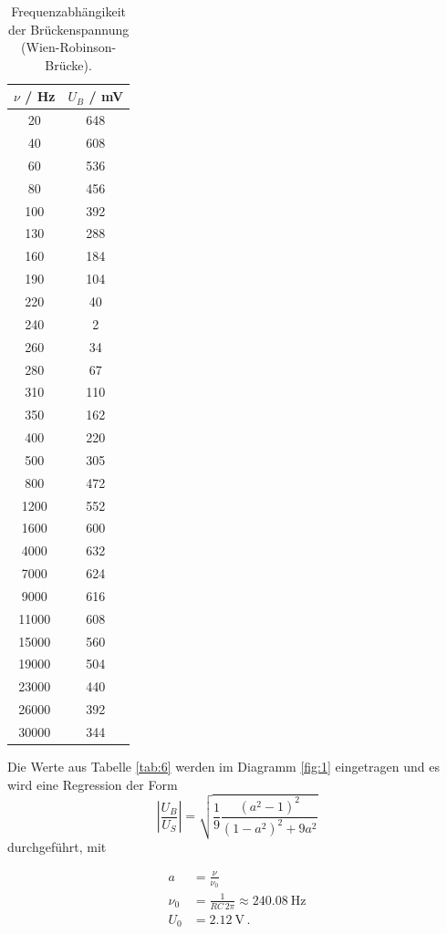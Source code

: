 \begin{table}
  \centering
  \caption{Frequenzabhängikeit der Brückenspannung (Wien-Robinson-Brücke).}
  \label{tab:7}
  \begin{tabular}{c c}
    \toprule
    $\nu$ / \si{\hertz} & $U_B$ / \si{\milli\volt}\\
    \midrule
    20  & 648  \\
    40  & 608  \\
    60  & 536  \\
    80  & 456  \\
    100 & 392  \\
    130 & 288  \\
    160 & 184  \\
    190 & 104  \\
    220 & 40  \\
    240 & 2  \\
    260 & 34  \\
    280 & 67  \\
    310 & 110  \\
    350 & 162  \\
    400 & 220  \\
    500 & 305  \\
    800 & 472  \\
    1200  & 552  \\
    1600  & 600  \\
    4000  & 632  \\
    7000  & 624  \\
    9000  & 616  \\
    11000 & 608  \\
    15000 & 560  \\
    19000 & 504  \\
    23000 & 440  \\
    26000 & 392  \\
    30000 & 344  \\
    \bottomrule
  \end{tabular}
\end{table}

Die Werte aus Tabelle \ref{tab:6} werden im Diagramm \ref{fig:1} eingetragen und es wird eine Regression der Form
\begin{equation*}
   \left|\frac{U_B}{U_S}\right| = \sqrt{\frac{1}{9} \frac{(a^2 - 1)^2}{(1-a^2)^2 + 9 a^2}}
  \end{equation*}
durchgeführt, mit

\begin{align*}
  a &= \frac{\nu}{\nu_0} \\
  \nu_0 &= \frac{1}{RC \, 2\pi} \approx \SI{240.08}{\hertz}\\
  U_0 &= \SI{2.12}{\volt} \, .
\end{align*}

